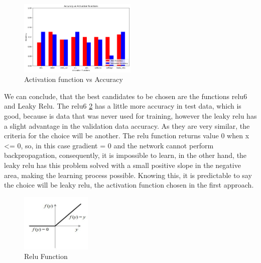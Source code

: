 \documentclass[12pt,a4paper,twocolumn]{article}
\begin{document}
\begin{figure}[H]
\includegraphics[width=0.5\textwidth]{images/activation.png}
\centering
\caption{\label{fig:activation} Activation function vs  Accuracy}
\end{figure}
\par We can conclude, that the best candidates to be chosen are the functions relu6 and Leaky Relu. The relu6 \ref{fig:relu} has a little more accuracy in test data, which is good, because is data that was never used for training, however the leaky relu has a slight advantage in the validation data accuracy. As they are very similar, the criteria for the choice will be another. The relu function returns  value 0 when x <= 0, so, in this case gradient = 0 and the network cannot perform backpropagation, consequently, it is impossible to learn, in the other hand, the leaky relu has this problem solved with a small positive slope in the negative area, making the learning process possible. Knowing this, it is predictable to say the choice will be leaky relu, the activation function chosen in the first approach.
\begin{figure}[H]
\includegraphics[width=0.3\textwidth]{images/relu.PNG}
\centering
\caption{\label{fig:relu} Relu Function}
\end{figure}
\end{document}
